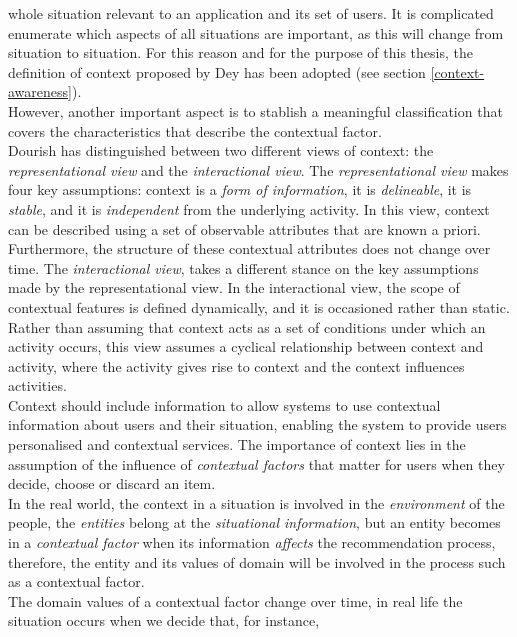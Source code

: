 whole situation relevant to an application and its set of users. It is
complicated enumerate which aspects of all situations are important,
as this will change from situation to situation. For this reason and
for the purpose of this thesis, the definition of context
proposed by Dey\cite{dey2001understanding} has been adopted (see section 
\ref{context-awareness}). \\However, another important aspect 
is to stablish a meaningful classification that covers the 
characteristics that describe the contextual factor.\\
Dourish\cite{dourish2004we} has distinguished between two different
views of context: the \textit{representational view} and the
\textit{interactional view}. The \textit{representational view} makes
four key assumptions: context is a \textit{form of information}, it is
\textit{delineable}, it is \textit{stable}, and it is
\textit{independent} from the underlying activity. In this view,
context can be described using a set of observable attributes that are
known a priori. Furthermore, the structure of these contextual
attributes does not change over time. The \textit{interactional view},
takes a different stance on the key assumptions made by the
representational view. In the interactional view, the scope of
contextual features is defined dynamically, and it is occasioned
rather than static. Rather than assuming that context acts as a set of
conditions under which an activity occurs, this view assumes a
cyclical relationship between context and activity, where the activity
gives rise to context and the context influences activities.\\
Context should include information to allow systems to use contextual
information about users and their situation, enabling the system 
to provide users personalised and contextual services. The importance of
context lies in the  assumption of the influence of \textit{contextual
factors} that matter for users when they decide, choose or discard an
item.\\
In the real world, the context in a situation is involved in the
\textit{environment} of the people, the \textit{entities} belong at
the \textit{situational information}, but an entity  becomes in a
\textit{contextual factor} when its information \textit{affects} the
recommendation process, therefore, the entity and its values of 
domain will be involved in the process such as a contextual factor.\\
The domain values of a contextual factor change over time, in
real life the situation occurs when we decide that, for instance,
